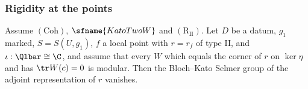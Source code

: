 \subsubsection{Rigidity at the points}

\begin{lemma}\label{pf:eis:bktypeII}
Assume $(\mathrm{Coh})$, $\sfname{KatoTwoW}$ and $(\mathrm{R}_{\mathrm{II}})$. Let $D$ be a datum, $g_1$ marked, $S=S(U,g_1)$, $f$ a local point
with $r=r_f$ of type II, and $\iota:\Qlbar\cong\C$, and assume that every $W$ which equals the corner of $r$ on $\ker\eta$ and has
$\tr W(c)=0$ is modular. Then the Bloch--Kato Selmer group of the adjoint representation of $r$ vanishes.
\end{lemma}

